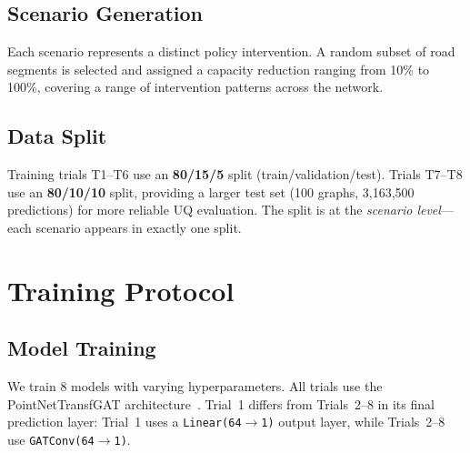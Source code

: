 \subsection{Scenario Generation}

Each scenario represents a distinct policy intervention. A random subset of road segments is selected and assigned a capacity reduction ranging from 10\% to 100\%, covering a range of intervention patterns across the network.

\subsection{Data Split}

Training trials T1--T6 use an \textbf{80/15/5} split (train/validation/test). Trials T7--T8 use an \textbf{80/10/10} split, providing a larger test set (100 graphs, 3,163,500 predictions) for more reliable UQ evaluation. The split is at the \emph{scenario level}---each scenario appears in exactly one split.

\section{Training Protocol}

\subsection{Model Training}

We train 8 models with varying hyperparameters. All trials use the PointNetTransfGAT architecture~\cite{natterer2025ml}. Trial~1 differs from Trials~2--8 in its final prediction layer: Trial~1 uses a \texttt{Linear(64$\to$1)} output layer, while Trials~2--8 use \texttt{GATConv(64$\to$1)}.

